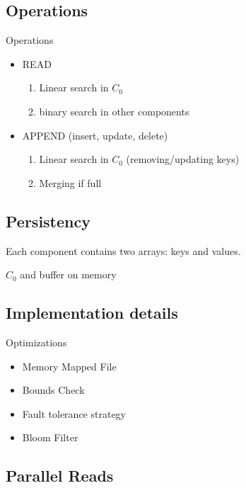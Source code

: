 \documentclass[pdf]{beamer}
\begin{document}
\subsection{Operations}

\begin{frame}{Operations}
	\begin{itemize}
		\item READ
		\begin{enumerate}
			\item Linear search in $C_0$
			\item binary search in other components
		\end{enumerate}				
		\item APPEND (insert, update, delete)
		\begin{enumerate}
			\item Linear search in $C_0$ (removing/updating keys)
			\item Merging if full
		\end{enumerate}	
	\end{itemize}
\end{frame}


\subsection{Persistency}

\begin{frame}
Each component contains two arrays: keys and values.

$C_0$ and buffer on memory
\end{frame}



\subsection{Implementation details}

\begin{frame}{Optimizations}
\begin{itemize}
	\item Memory Mapped File
	\item Bounds Check
	\item Fault tolerance strategy
	\item Bloom Filter
\end{itemize}
\end{frame}

\subsection{Parallel Reads}
\end{document}
